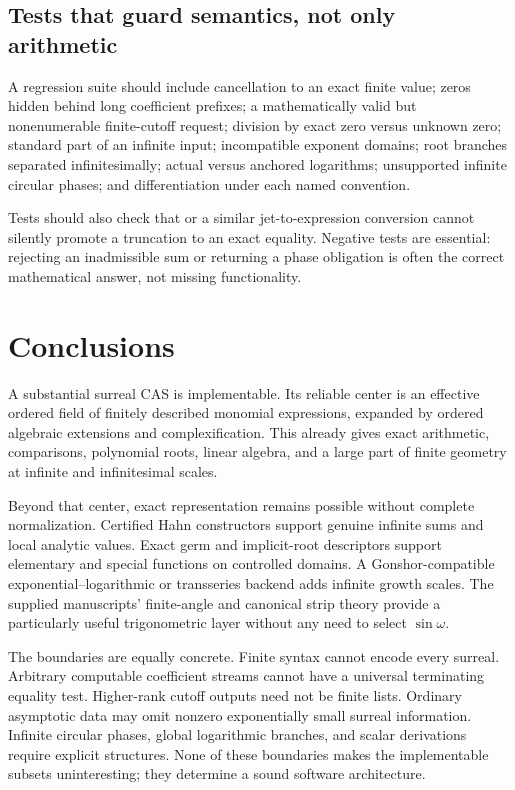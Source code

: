 \documentclass[11pt,letterpaper]{article}
\theoremstyle{definition}
\newcommand{\code}[1]{\texttt{\detokenize{#1}}}
\numberwithin{equation}{section}
\begin{document}
\subsection{Tests that guard semantics, not only arithmetic}
A regression suite should include cancellation to an exact finite value; zeros hidden behind long coefficient prefixes; a mathematically valid but nonenumerable finite-cutoff request; division by exact zero versus unknown zero; standard part of an infinite input; incompatible exponent domains; root branches separated infinitesimally; actual versus anchored logarithms; unsupported infinite circular phases; and differentiation under each named convention.

Tests should also check that \code{Normal} or a similar jet-to-expression conversion cannot silently promote a truncation to an exact equality. Negative tests are essential: rejecting an inadmissible sum or returning a phase obligation is often the correct mathematical answer, not missing functionality.

\section{Conclusions}\label{sec:conclusions}
A substantial surreal CAS is implementable. Its reliable center is an effective ordered field of finitely described monomial expressions, expanded by ordered algebraic extensions and complexification. This already gives exact arithmetic, comparisons, polynomial roots, linear algebra, and a large part of finite geometry at infinite and infinitesimal scales.

Beyond that center, exact representation remains possible without complete normalization. Certified Hahn constructors support genuine infinite sums and local analytic values. Exact germ and implicit-root descriptors support elementary and special functions on controlled domains. A Gonshor-compatible exponential--logarithmic or transseries backend adds infinite growth scales. The supplied manuscripts' finite-angle and canonical strip theory provide a particularly useful trigonometric layer without any need to select $\sin\omega$.

The boundaries are equally concrete. Finite syntax cannot encode every surreal. Arbitrary computable coefficient streams cannot have a universal terminating equality test. Higher-rank cutoff outputs need not be finite lists. Ordinary asymptotic data may omit nonzero exponentially small surreal information. Infinite circular phases, global logarithmic branches, and scalar derivations require explicit structures. None of these boundaries makes the implementable subsets uninteresting; they determine a sound software architecture.
\end{document}
